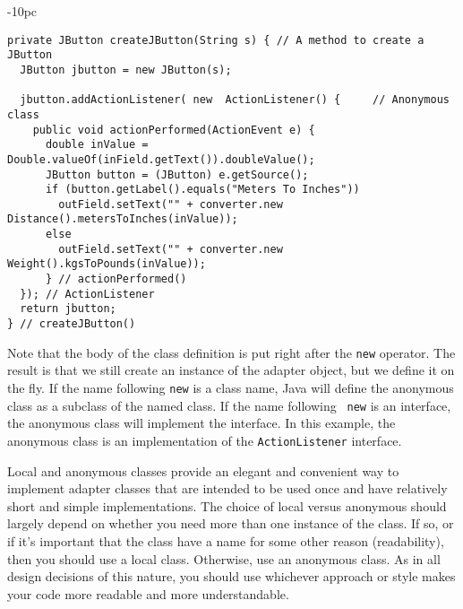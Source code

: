 \begin{jjjlistingleft}[36pc]{-10pc}
\begin{lstlisting}
private JButton createJButton(String s) { // A method to create a JButton
  JButton jbutton = new JButton(s);

  jbutton.addActionListener( new  ActionListener() {     // Anonymous class
    public void actionPerformed(ActionEvent e) {
      double inValue = Double.valueOf(inField.getText()).doubleValue();
      JButton button = (JButton) e.getSource();
      if (button.getLabel().equals("Meters To Inches"))
        outField.setText("" + converter.new Distance().metersToInches(inValue));
      else
        outField.setText("" + converter.new Weight().kgsToPounds(inValue));
      } // actionPerformed()
  }); // ActionListener
  return jbutton;
} // createJButton()
\end{lstlisting}
\end{jjjlistingleft}

\noindent Note that the body of the class definition is put right after
the {\tt new} operator.  The result is that we still create an instance
of the adapter object, but we define it on the fly.  If the name
following {\tt new} is a class name, Java will define the anonymous
class as a subclass of the named class.  If the name following {\tt
new} is an interface, the anonymous class will implement the
interface.  In this example, the anonymous class is an implementation
of the {\tt ActionListener} interface.

Local and anonymous classes provide an elegant and convenient way to
implement adapter classes that are intended to be used once and have
relatively short and simple implementations.  The choice of local
versus anonymous should largely depend on whether you need more than
one instance of the class.  If so, or if it's important that the class
have a name for some other reason (readability), then you should use a
local class.  Otherwise, use an anonymous class.  As in all design
decisions of this nature, you should use whichever approach or style
makes your code more readable and more understandable.
%
